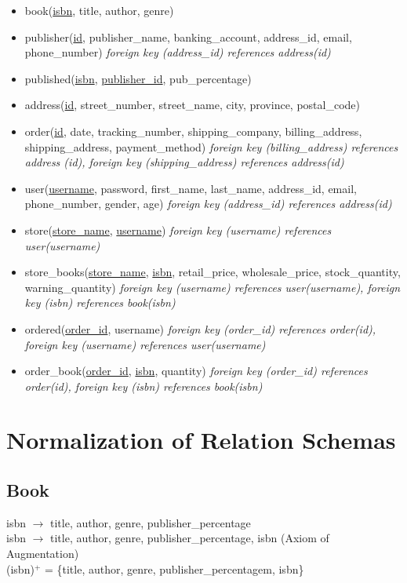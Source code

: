 \documentclass{article}
\begin{document}
    \begin{itemize}
        \item book(\underline{isbn}, title, author, genre)
        \item publisher(\underline{id}, publisher\_name, banking\_account, address\_id, email, phone\_number) \emph{foreign key (address\_id) references address(id)}
        \item published(\underline{isbn}, \underline{publisher\_id}, pub\_percentage)
        \item address(\underline{id}, street\_number, street\_name, city, province, postal\_code)
        \item order(\underline{id}, date, tracking\_number, shipping\_company, billing\_address, shipping\_address, payment\_method) \emph{foreign key (billing\_address) references address (id), foreign key (shipping\_address) references address(id)}
        \item user(\underline{username}, password, first\_name, last\_name, address\_id, email, phone\_number, gender, age) \emph{foreign key (address\_id) references address(id)}
        \item store(\underline{store\_name}, \underline{username}) \emph{foreign key (username) references user(username)}
        \item store\_books(\underline{store\_name}, \underline{isbn}, retail\_price, wholesale\_price, stock\_quantity, warning\_quantity) \emph{foreign key (username) references user(username), foreign key (isbn) references book(isbn)}
        \item ordered(\underline{order\_id}, username) \emph{foreign key (order\_id) references order(id), foreign key (username) references user(username)}
        \item order\_book(\underline{order\_id}, \underline{isbn}, quantity) \emph{foreign key (order\_id) references order(id), foreign key (isbn) references book(isbn)}
    \end{itemize}

    \section{Normalization of Relation Schemas}
    
    \subsection{Book}
    
    isbn $\rightarrow$ title, author, genre, publisher\_percentage \\
    isbn $\rightarrow$ title, author, genre, publisher\_percentage, isbn (Axiom of Augmentation) \\
    (isbn)$^+$ = \{title, author, genre, publisher\_percentagem, isbn\} \\
    
\end{document}
